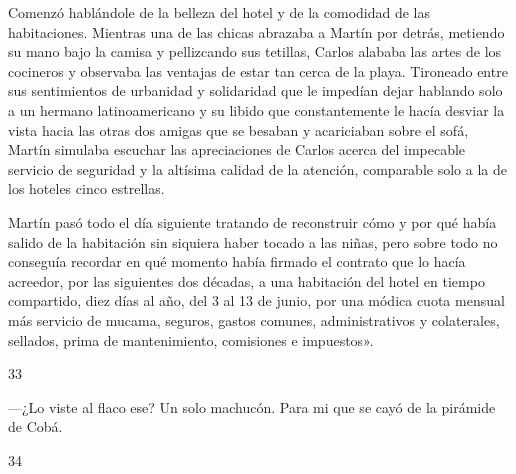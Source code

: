 \documentclass[12pt,twoside,openright,a5paper]{book}
\begin{document}
Comenzó hablándole de la belleza del hotel y de la comodidad de las
habitaciones. Mientras una de las chicas abrazaba a Martín por detrás,
metiendo su mano bajo la camisa y pellizcando sus tetillas, Carlos alababa
las artes de los cocineros y observaba las ventajas de estar tan cerca de
la playa. Tironeado entre sus sentimientos de urbanidad y solidaridad que le
impedían dejar hablando solo a un hermano latinoamericano y su libido
que constantemente le hacía desviar la vista hacia las otras dos amigas
que se besaban y acariciaban sobre el sofá, Martín simulaba escuchar
las apreciaciones de Carlos acerca del impecable servicio de seguridad y
la altísima calidad de la atención, comparable solo a la de los hoteles
cinco estrellas.

Martín pasó todo el día siguiente tratando de reconstruir cómo y por qué
había salido de la habitación sin siquiera haber tocado a las niñas, pero
sobre todo no conseguía recordar en qué momento había firmado el contrato
que lo hacía acreedor, por las siguientes dos décadas, a una habitación
del hotel en tiempo compartido, diez días al año, del 3 al 13 de junio,
por una módica cuota mensual más servicio de mucama, seguros, gastos
comunes, administrativos y colaterales, sellados, prima de mantenimiento,
comisiones e impuestos».

\vspace{0.5cm}

\hrulefill \hspace{0.1cm}\decofourleft\hspace{0.2cm} 33 \hspace{0.2cm}\decofourright \hspace{0.1cm}\hrulefill

\nopagebreak

\vspace{0.5cm}

\nopagebreak

---¿Lo viste al flaco ese? Un solo machucón. Para mi que se cayó de la
pirámide de Cobá.


\vspace{0.5cm}
\afterpage{}
\hrulefill \hspace{0.1cm}\decofourleft\hspace{0.2cm} 34 \hspace{0.2cm}\decofourright \hspace{0.1cm}\hrulefill

\nopagebreak

\vspace{0.5cm}
\end{document}
